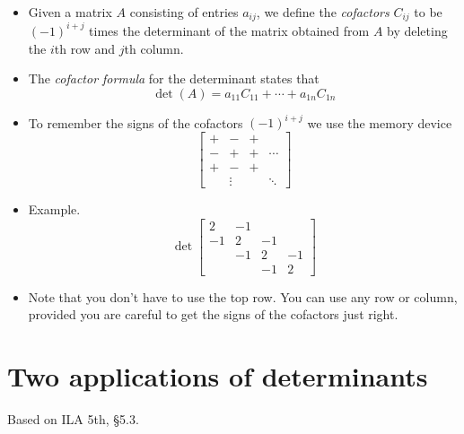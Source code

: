 \documentclass[11pt,oneside]{amsbook}
\theoremstyle{definition}
\theoremstyle{plain}
\theoremstyle{definition}
\theoremstyle{remark}
\numberwithin{equation}{section}
\numberwithin{figure}{section}
\begin{document}
\begin{itemize}
\[  \]
\item Given a matrix $A$ consisting of entries $a_{ij}$, we define the \emph{cofactors} $C_{ij}$ to be $(-1)^{i+j}$ times the determinant of the matrix obtained from $A$ by deleting the $i$th row and $j$th column.
\item The \emph{cofactor formula} for the determinant states that
  \[\det(A)=a_{11}C_{11}+\cdots+a_{1n}C_{1n}
  \]
\item To remember the signs of the cofactors $(-1)^{i+j}$ we use the memory device
  \[\begin{bmatrix}
      +&-&+\\-&+&+&\cdots\\+&-&+\\&\vdots&&\ddots
    \end{bmatrix}
  \]
\item Example.
  \[\det\begin{bmatrix}
      2&-1\\-1&2&-1\\&-1&2&-1\\&&-1&2
    \end{bmatrix}
  \]
\item Note that you don't have to use the top row. You can use any row or column, provided you are careful to get the signs of the cofactors just right.
\end{itemize}

\newpage
\section{Two applications of determinants}

Based on ILA 5th, \S 5.3.
\end{document}
